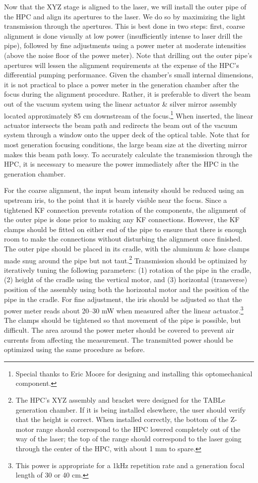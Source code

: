Now that the XYZ stage is aligned to the laser, we will install the outer pipe of the HPC and align its apertures to the laser. We do so by maximizing the light transmission through the apertures. This is best done in two steps: first, coarse alignment is done visually at low power (insufficiently intense to laser drill the pipe), followed by fine adjustments using a power meter at moderate intensities (above the noise floor of the power meter). Note that drilling out the outer pipe's apertures will lessen the alignment requirements at the expense of the HPC's differential pumping performance. Given the chamber's small internal dimensions, it is not practical to place a power meter in the generation chamber after the focus during the alignment procedure. Rather, it is preferable to divert the beam out of the vacuum system using the linear actuator \& silver mirror assembly located approximately 85 cm downstream of the focus.\footnote{Special thanks to Eric Moore for designing and installing this optomechanical component.} When inserted, the linear actuator intersects the beam path and redirects the beam out of the vacuum system through a window onto the upper deck of the optical table. Note that for most generation focusing conditions, the large beam size at the diverting mirror makes this beam path lossy. To accurately calculate the transmission through the HPC, it is necessary to measure the power immediately after the HPC in the generation chamber.

For the coarse alignment, the input beam intensity should be reduced using an upstream iris, to the point that it is barely visible near the focus. Since a tightened KF connection prevents rotation of the components, the alignment of the outer pipe is done prior to making any KF connections. However, the KF clamps should be fitted on either end of the pipe to ensure that there is enough room to make the connections without disturbing the alignment once finished. The outer pipe should be placed in its cradle, with the aluminum \& hose clamps made snug around the pipe but not taut.\footnote{The HPC's XYZ assembly and bracket were designed for the TABLe generation chamber. If it is being installed elsewhere, the user should verify that the height is correct. When installed correctly, the bottom of the Z-motor range should correspond to the HPC lowered completely out of the way of the laser; the top of the range should correspond to the laser going through the center of the HPC, with about 1 mm to spare.} Transmission should be optimized by iteratively tuning the following parameters: (1) rotation of the pipe in the cradle, (2) height of the cradle using the vertical motor, and (3) horizontal (transverse) position of the assembly using both the horizontal motor and the position of the pipe in the cradle. For fine adjustment, the iris should be adjusted so that the power meter reads about 20--30 mW when measured after the linear actuator.\footnote{This power is appropriate for a 1kHz repetition rate and a generation focal length of 30 or 40 cm.} The clamps should be tightened so that movement of the pipe is possible, but difficult. The area around the power meter should be covered to prevent air currents from affecting the measurement. The transmitted power should be optimized using the same procedure as before.

